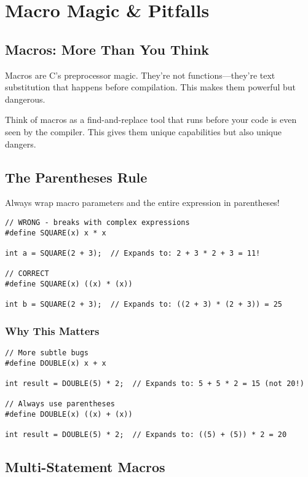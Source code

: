 \chapter{Macro Magic \& Pitfalls}

\section{Macros: More Than You Think}

Macros are C's preprocessor magic. They're not functions—they're text substitution that happens before compilation. This makes them powerful but dangerous.

Think of macros as a find-and-replace tool that runs before your code is even seen by the compiler. This gives them unique capabilities but also unique dangers.

\section{The Parentheses Rule}

\begin{warningbox}
Always wrap macro parameters and the entire expression in parentheses!
\end{warningbox}

\begin{lstlisting}
// WRONG - breaks with complex expressions
#define SQUARE(x) x * x

int a = SQUARE(2 + 3);  // Expands to: 2 + 3 * 2 + 3 = 11!

// CORRECT
#define SQUARE(x) ((x) * (x))

int b = SQUARE(2 + 3);  // Expands to: ((2 + 3) * (2 + 3)) = 25
\end{lstlisting}

\subsection{Why This Matters}

\begin{lstlisting}
// More subtle bugs
#define DOUBLE(x) x + x

int result = DOUBLE(5) * 2;  // Expands to: 5 + 5 * 2 = 15 (not 20!)

// Always use parentheses
#define DOUBLE(x) ((x) + (x))

int result = DOUBLE(5) * 2;  // Expands to: ((5) + (5)) * 2 = 20
\end{lstlisting}

\section{Multi-Statement Macros}

